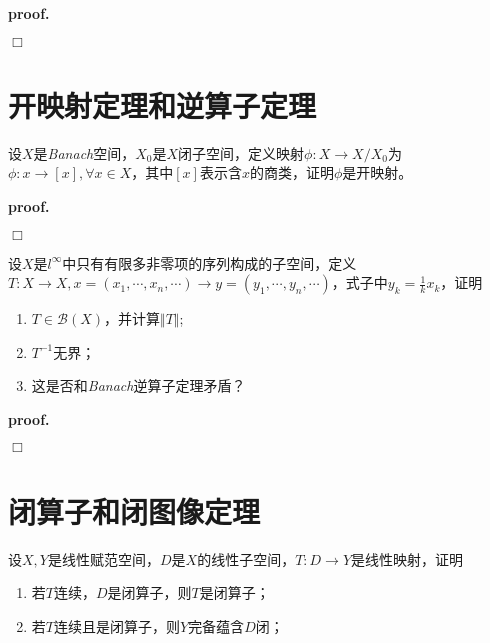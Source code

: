 \textbf{proof.}

$\Box$

\section{开映射定理和逆算子定理}

\begin{mdframed}
    \begin{question}
        设$X$是\textsl{Banach}空间，$X_0$是$X$闭子空间，定义映射$\phi:X\rightarrow X/X_0$为$\phi:x\rightarrow [x],\forall x\in X$，其中$[x]$表示含$x$的商类，证明$\phi$是开映射。
    \end{question}
\end{mdframed}

\textbf{proof.}

$\Box$

\begin{mdframed}
    \begin{question}
        设$X$是$l^\infty$中只有有限多非零项的序列构成的子空间，定义$T:X\rightarrow X,x=(x_1,\cdots,x_n,\cdots)\rightarrow y=(y_1,\cdots,y_n,\cdots)$，式子中$y_k=\frac{1}{k}x_k$，证明
        \begin{enumerate}
            \item $T\in \mathcal{B}(X)$，并计算$\Vert T\Vert$;
            \item $T^{-1}$无界；
            \item 这是否和\textsl{Banach}逆算子定理矛盾？
        \end{enumerate}
    \end{question}
\end{mdframed}

\textbf{proof.}

$\Box$

\section{闭算子和闭图像定理}

\begin{mdframed}
    \begin{question}
        设$X,Y$是线性赋范空间，$D$是$X$的线性子空间，$T:D\rightarrow Y$是线性映射，证明
        \begin{enumerate}[itemindent=2em]
            \item 若$T$连续，$D$是闭算子，则$T$是闭算子；
            \item 若$T$连续且是闭算子，则$Y$完备蕴含$D$闭；
        \end{enumerate}
    \end{question}
\end{mdframed}

